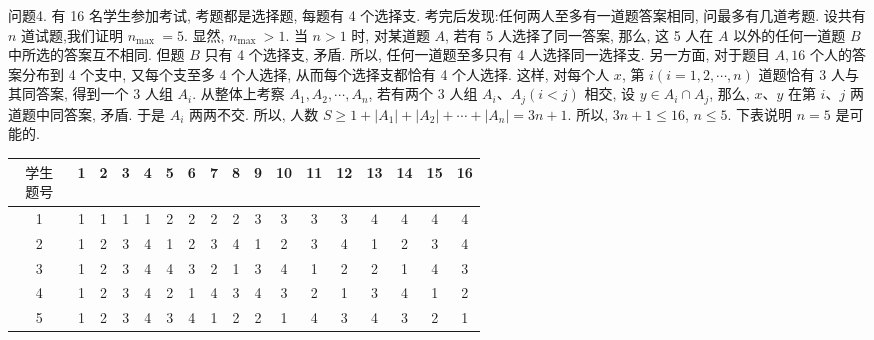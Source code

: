 问题4. 有 16 名学生参加考试, 考题都是选择题, 每题有 4 个选择支.
考完后发现:任何两人至多有一道题答案相同, 问最多有几道考题.
设共有 $n$ 道试题,我们证明 $n_{\text {max }}=5$. 显然, $n_{\text {max }}>1$. 当 $n>1$ 时, 对某道题 $A$, 若有 5 人选择了同一答案, 那么, 这 5 人在 $A$ 以外的任何一道题 $B$ 中所选的答案互不相同.
但题 $B$ 只有 4 个选择支, 矛盾.
所以, 任何一道题至多只有 4 人选择同一选择支.
另一方面, 对于题目 $A, 16$ 个人的答案分布到 4 个支中, 又每个支至多 4 个人选择, 从而每个选择支都恰有 4 个人选择.
这样, 对每个人 $x$, 第 $i(i=1,2, \cdots, n)$ 道题恰有 3 人与其同答案, 得到一个 3 人组 $A_i$. 从整体上考察 $A_1, A_2, \cdots, A_n$, 若有两个 3 人组 $A_i 、 A_j(i<j)$ 相交, 设 $y \in A_i \cap A_j$, 那么, $x 、 y$ 在第 $i 、 j$ 两道题中同答案, 矛盾.
于是 $A_i$ 两两不交.
所以, 人数 $S \geqslant 1+\left|A_1\right|+\left|A_2\right|+\cdots+\left|A_n\right|=3 n+1$. 所以, $3 n+1 \leqslant 16$, $n \leqslant 5$. 下表说明 $n=5$ 是可能的.
\begin{tabular}{|c|c|c|c|c|c|c|c|c|c|c|c|c|c|c|c|c|}
\hline $\begin{array}{r}\text { 学生 } \\
\text { 题号 }\end{array}$ & 1 & 2 & 3 & 4 & 5 & 6 & 7 & 8 & 9 & 10 & 11 & 12 & 13 & 14 & 15 & 16 \\
\hline 1 & 1 & 1 & 1 & 1 & 2 & 2 & 2 & 2 & 3 & 3 & 3 & 3 & 4 & 4 & 4 & 4 \\
\hline 2 & 1 & 2 & 3 & 4 & 1 & 2 & 3 & 4 & 1 & 2 & 3 & 4 & 1 & 2 & 3 & 4 \\
\hline 3 & 1 & 2 & 3 & 4 & 4 & 3 & 2 & 1 & 3 & 4 & 1 & 2 & 2 & 1 & 4 & 3 \\
\hline 4 & 1 & 2 & 3 & 4 & 2 & 1 & 4 & 3 & 4 & 3 & 2 & 1 & 3 & 4 & 1 & 2 \\
\hline 5 & 1 & 2 & 3 & 4 & 3 & 4 & 1 & 2 & 2 & 1 & 4 & 3 & 4 & 3 & 2 & 1 \\
\hline
\end{tabular}



